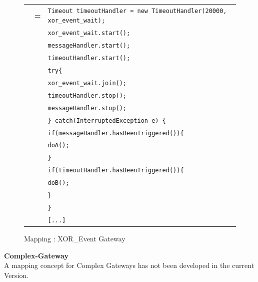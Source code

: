 \begin{figure}[h]
\begin{tabularx}{\linewidth}{lcX}
	& \textbf{\textcolor{blue}{=}} & \texttt{Timeout timeoutHandler = new TimeoutHandler(20000, xor\_event\_wait);}\\
	& & \texttt{xor\_event\_wait.start();}\\
	& & \texttt{messageHandler.start();}\\
	& & \texttt{timeoutHandler.start();}\\
	& & \texttt{try\{}\\
	& & \texttt{\hspace{10pt}xor\_event\_wait.join();}\\
	& & \texttt{\hspace{10pt}timeoutHandler.stop();}\\
	& & \texttt{\hspace{10pt}messageHandler.stop();}\\
	& & \texttt{\} catch(InterruptedException e) \{}\\
	& & \texttt{\hspace{10pt}if(messageHandler.hasBeenTriggered())\{}\\
	& & \texttt{\hspace{20pt}doA();}\\
	& & \texttt{\hspace{10pt}\}}\\
	& & \texttt{\hspace{10pt}if(timeoutHandler.hasBeenTriggered())\{}\\
	& & \texttt{\hspace{20pt}doB();}\\
	& & \texttt{\hspace{10pt}\}}\\
	& & \texttt{\}}\\
	& & \texttt{[...]}\\
\end{tabularx}
\caption{Mapping : XOR\_Event Gateway}%
\label{fig:mapping_xorEvent}%
\end{figure}

\textbf{Complex-Gateway}\\
A mapping concept for Complex Gateways has not been developed in the current Version. \\
